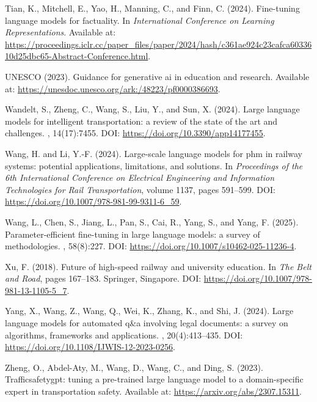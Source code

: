 \documentclass{article}
\begin{document}
\begin{thebibliography}{}
Tian, K., Mitchell, E., Yao, H., Manning, C., and Finn, C. (2024).
\newblock Fine-tuning language models for factuality.
\newblock In {\em International Conference on Learning Representations}.
\newblock Available at:
  \url{https://proceedings.iclr.cc/paper_files/paper/2024/hash/c361ae924c23cafca6033610d25dbc65-Abstract-Conference.html}.

{UNESCO} (2023).
\newblock Guidance for generative ai in education and research.
\newblock Available at:
  \url{https://unesdoc.unesco.org/ark:/48223/pf0000386693}.

Wandelt, S., Zheng, C., Wang, S., Liu, Y., and Sun, X. (2024).
\newblock Large language models for intelligent transportation: a review of the
  state of the art and challenges.
, 14(17):7455.
\newblock DOI: \url{https://doi.org/10.3390/app14177455}.

Wang, H. and Li, Y.-F. (2024).
\newblock Large-scale language models for phm in railway systems: potential
  applications, limitations, and solutions.
\newblock In {\em Proceedings of the 6th International Conference on Electrical
  Engineering and Information Technologies for Rail Transportation}, volume
  1137, pages 591--599.
\newblock DOI: \url{https://doi.org/10.1007/978-981-99-9311-6_59}.

Wang, L., Chen, S., Jiang, L., Pan, S., Cai, R., Yang, S., and Yang, F. (2025).
\newblock Parameter-efficient fine-tuning in large language models: a survey of
  methodologies.
, 58(8):227.
\newblock DOI: \url{https://doi.org/10.1007/s10462-025-11236-4}.

Xu, F. (2018).
\newblock Future of high-speed railway and university education.
\newblock In {\em The Belt and Road}, pages 167--183. Springer, Singapore.
\newblock DOI: \url{https://doi.org/10.1007/978-981-13-1105-5_7}.

Yang, X., Wang, Z., Wang, Q., Wei, K., Zhang, K., and Shi, J. (2024).
\newblock Large language models for automated q\&a involving legal documents: a
  survey on algorithms, frameworks and applications.
,
  20(4):413--435.
\newblock DOI: \url{https://doi.org/10.1108/IJWIS-12-2023-0256}.

Zheng, O., Abdel-Aty, M., Wang, D., Wang, C., and Ding, S. (2023).
\newblock Trafficsafetygpt: tuning a pre-trained large language model to a
  domain-specific expert in transportation safety.
\newblock Available at: \url{https://arxiv.org/abs/2307.15311}.

\end{thebibliography}
\end{document}
